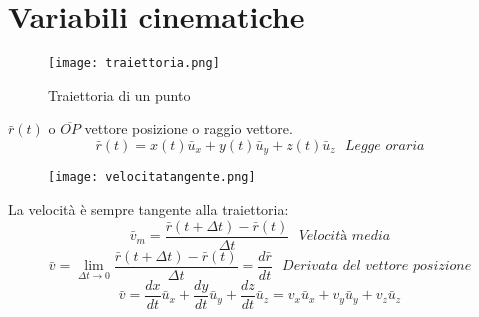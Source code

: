 \documentclass[../../main.tex]{subfiles}
\begin{document}
\section{Variabili cinematiche}
\begin{figure}[h!]
    \centering
    \texttt{[image: traiettoria.png]}
    \caption{Traiettoria di un punto}
\end{figure}
$\bar{r}(t)$ o $\overline{OP}$ vettore posizione o raggio vettore.
\[
    \bar r(t) = x(t)\bar{u}_x + y(t)\bar{u}_y + z(t)\bar{u}_z \ \ \ \textit{Legge oraria}
\]
\begin{figure}[h!]
    \centering
    \texttt{[image: velocitatangente.png]}
\end{figure}
La velocità è sempre tangente alla traiettoria:
\[
    \bar{v}_m = \dfrac{\bar{r}(t + \Delta t) - \bar{r}(t)}{\Delta t} \ \ \ \textit{Velocità media}
\]
\[
    \bar{v} = \lim_{\Delta t \to 0} \dfrac{\bar{r}(t + \Delta t) - \bar{r}(t)}{\Delta t} = \dfrac{d\bar{r}}{dt} \ \ \ \textit{Derivata del vettore posizione}
\]
\[
    \bar{v} = \dfrac{dx}{dt} \bar{u}_x + \dfrac{dy}{dt} \bar{u}_y + \dfrac{dz}{dt} \bar{u}_z = v_x\bar{u}_x + v_y\bar{u}_y + v_z\bar{u}_z
\]
\end{document}
